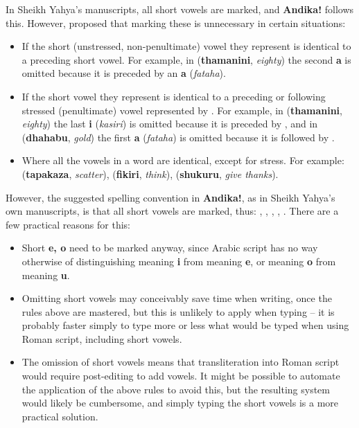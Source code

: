 In Sheikh Yahya's manuscripts, all short vowels are marked, and \textbf{Andika!} follows this.  However, \citet{Omar1997} proposed that marking these is unnecessary in certain situations:
\begin{itemize}
\item If the short (unstressed, non-penultimate) vowel they represent is identical to a preceding short vowel. For example, in   (\textbf{thamanini}, \textit{eighty}) the second \textbf{a} is omitted because it is preceded by an \textbf{a} (\textit{fataha}).

\item If the short vowel they represent is identical to a preceding or following stressed (penultimate) vowel represented by . For example, in  (\textbf{thamanini}, \textit{eighty}) the last \textbf{i} (\textit{kasiri}) is omitted because it is preceded by , and in  (\textbf{dhahabu}, \textit{gold}) the first \textbf{a} (\textit{fataha}) is omitted because it is followed by .

\item Where all the vowels in a word are identical, except for stress. For example:  (\textbf{tapakaza}, \textit{scatter}),  (\textbf{fikiri}, \textit{think}),  (\textbf{shukuru}, \textit{give thanks}).
\end{itemize}

However, the suggested spelling convention in \textbf{Andika!}, as in Sheikh Yahya's own manuscripts, is that all short vowels are marked, thus: , , , , .  There are a few practical reasons for this:
\begin{itemize}
\item Short \textbf{e, o} need to be marked anyway, since Arabic script has no way otherwise of distinguishing   meaning \textbf{i} from  meaning \textbf{e}, or  meaning \textbf{o} from  meaning \textbf{u}.

\item Omitting short vowels may conceivably save time when writing, once the rules above are mastered, but this is unlikely to apply when typing -- it is probably faster simply to type more or less what would be typed when using Roman script, including short vowels.

\item The omission of short vowels means that transliteration into Roman script would require post-editing to add vowels. It might be possible to automate the application of the above rules to avoid this, but the resulting system would likely be cumbersome, and simply typing the short vowels is a more practical solution.
\end{itemize}

